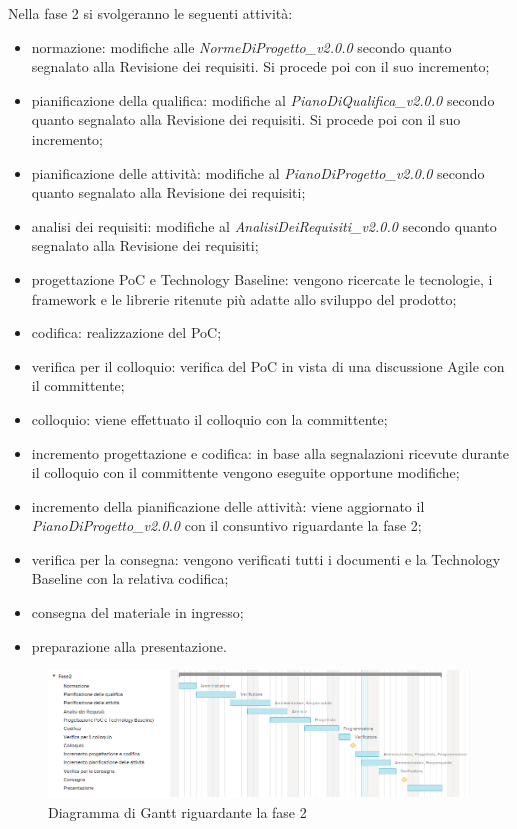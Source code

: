 Nella fase 2 si svolgeranno le seguenti attività:
\begin{itemize}
	\item normazione: modifiche alle \textit{NormeDiProgetto\_v2.0.0} secondo quanto segnalato alla Revisione dei requisiti. Si procede poi con il suo incremento;
	\item pianificazione della qualifica: modifiche al \textit{PianoDiQualifica\_v2.0.0} secondo quanto segnalato alla Revisione dei requisiti. Si procede poi con il suo incremento;
	\item pianificazione delle attività: modifiche al \textit{PianoDiProgetto\_v2.0.0} secondo quanto segnalato alla Revisione dei requisiti;
	\item analisi dei requisiti: modifiche al \textit{AnalisiDeiRequisiti\_v2.0.0} secondo quanto segnalato alla Revisione dei requisiti;
	\item progettazione PoC e Technology Baseline: vengono ricercate le tecnologie, i framework e le librerie ritenute più adatte allo sviluppo del prodotto;
	\item codifica: realizzazione del PoC;
	\item verifica per il colloquio: verifica del PoC in vista di una discussione Agile con il committente;
	\item colloquio: viene effettuato il colloquio con la committente;
	\item incremento progettazione e codifica: in base alla segnalazioni ricevute durante il colloquio con il committente vengono eseguite opportune modifiche;
	\item incremento della pianificazione delle attività: viene aggiornato il \textit{PianoDiProgetto\_v2.0.0} con il consuntivo riguardante la fase 2;
	\item verifica per la consegna: vengono verificati tutti i documenti e la Technology Baseline con la relativa codifica;
	\item consegna del materiale in ingresso;
	\item preparazione alla presentazione.
\end{itemize}

\begin{figure}[h]
	\centering
	\includegraphics[scale=0.67]{images/fase2.png}
	\caption{Diagramma di Gantt riguardante la fase 2}
\end{figure}